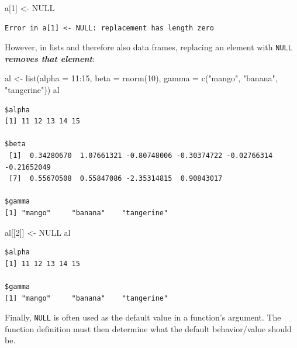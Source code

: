 \documentclass[
]{book}
\newenvironment{Shaded}{\begin{snugshade}}{\end{snugshade}}
\newcommand{\AttributeTok}[1]{\textcolor[rgb]{0.77,0.63,0.00}{#1}}
\newcommand{\ConstantTok}[1]{\textcolor[rgb]{0.00,0.00,0.00}{#1}}
\newcommand{\DecValTok}[1]{\textcolor[rgb]{0.00,0.00,0.81}{#1}}
\newcommand{\FunctionTok}[1]{\textcolor[rgb]{0.00,0.00,0.00}{#1}}
\newcommand{\NormalTok}[1]{#1}
\newcommand{\OtherTok}[1]{\textcolor[rgb]{0.56,0.35,0.01}{#1}}
\newcommand{\SpecialCharTok}[1]{\textcolor[rgb]{0.00,0.00,0.00}{#1}}
\newcommand{\StringTok}[1]{\textcolor[rgb]{0.31,0.60,0.02}{#1}}
\begin{document}
\begin{Shaded}
\begin{Highlighting}[]
\NormalTok{a[}\DecValTok{1}\NormalTok{] }\OtherTok{\textless{}{-}} \ConstantTok{NULL}
\end{Highlighting}
\end{Shaded}

\begin{verbatim}
Error in a[1] <- NULL: replacement has length zero
\end{verbatim}

However, in lists and therefore also data frames, replacing an element with \texttt{NULL} \textbf{\emph{removes that element}}:

\begin{Shaded}
\begin{Highlighting}[]
\NormalTok{al }\OtherTok{\textless{}{-}} \FunctionTok{list}\NormalTok{(}\AttributeTok{alpha =} \DecValTok{11}\SpecialCharTok{:}\DecValTok{15}\NormalTok{,}
           \AttributeTok{beta =} \FunctionTok{rnorm}\NormalTok{(}\DecValTok{10}\NormalTok{),}
           \AttributeTok{gamma =} \FunctionTok{c}\NormalTok{(}\StringTok{"mango"}\NormalTok{, }\StringTok{"banana"}\NormalTok{, }\StringTok{"tangerine"}\NormalTok{))}
\NormalTok{al}
\end{Highlighting}
\end{Shaded}

\begin{verbatim}
$alpha
[1] 11 12 13 14 15

$beta
 [1]  0.34280670  1.07661321 -0.80748006 -0.30374722 -0.02766314 -0.21652049
 [7]  0.55670508  0.55847086 -2.35314815  0.90843017

$gamma
[1] "mango"     "banana"    "tangerine"
\end{verbatim}

\begin{Shaded}
\begin{Highlighting}[]
\NormalTok{al[[}\DecValTok{2}\NormalTok{]] }\OtherTok{\textless{}{-}} \ConstantTok{NULL}
\NormalTok{al}
\end{Highlighting}
\end{Shaded}

\begin{verbatim}
$alpha
[1] 11 12 13 14 15

$gamma
[1] "mango"     "banana"    "tangerine"
\end{verbatim}

Finally, \texttt{NULL} is often used as the default value in a function's argument. The function definition must then determine what the default behavior/value should be.
\end{document}

